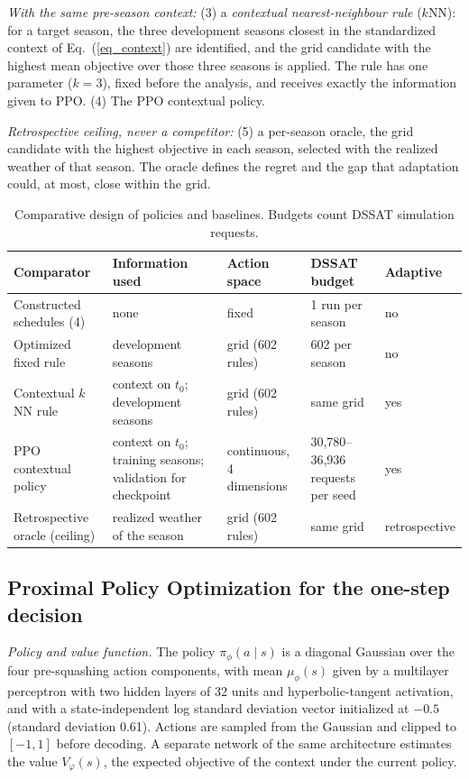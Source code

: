 \documentclass[times,final,authoryear]{elsarticle}
\begin{document}
\emph{With the same pre-season context:} (3) a \emph{contextual nearest-neighbour rule} ($k$NN): for a target season, the three development seasons closest in the standardized context of Eq.~(\ref{eq_context}) are identified, and the grid candidate with the highest mean objective over those three seasons is applied. The rule has one parameter ($k = 3$), fixed before the analysis, and receives exactly the information given to PPO. (4) The PPO contextual policy.

\emph{Retrospective ceiling, never a competitor:} (5) a per-season oracle, the grid candidate with the highest objective in each season, selected with the realized weather of that season. The oracle defines the regret and the gap that adaptation could, at most, close within the grid.

\begin{table}[!h]
\centering
\footnotesize
\caption{Comparative design of policies and baselines. Budgets count DSSAT simulation requests.}
\label{tab_design}
\begin{tabular}{p{3.6cm}p{3.3cm}p{2.5cm}p{3.0cm}p{1.4cm}}
\hline
Comparator & Information used & Action space & DSSAT budget & Adaptive \\
\hline
Constructed schedules (4) & none & fixed & 1 run per season & no \\
Optimized fixed rule & development seasons & grid (602 rules) & 602 per season & no \\
Contextual $k$NN rule & context on $t_0$; development seasons & grid (602 rules) & same grid & yes \\
PPO contextual policy & context on $t_0$; training seasons; validation for checkpoint & continuous, 4 dimensions & 30,780--36,936 requests per seed & yes \\
Retrospective oracle (ceiling) & realized weather of the season & grid (602 rules) & same grid & retrospective \\
\hline
\end{tabular}
\end{table}

\subsection{Proximal Policy Optimization for the one-step decision}
\label{subppo}

\emph{Policy and value function.} The policy $\pi_\phi(a \mid s)$ is a diagonal Gaussian over the four pre-squashing action components, with mean $\mu_\phi(s)$ given by a multilayer perceptron with two hidden layers of 32 units and hyperbolic-tangent activation, and with a state-independent log standard deviation vector initialized at $-0.5$ (standard deviation 0.61). Actions are sampled from the Gaussian and clipped to $[-1,1]$ before decoding. A separate network of the same architecture estimates the value $V_\varphi(s)$, the expected objective of the context under the current policy.
\end{document}
